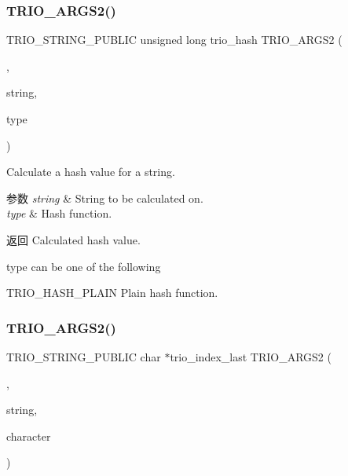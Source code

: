 \subsubsection{\texorpdfstring{T\+R\+I\+O\+\_\+\+A\+R\+G\+S2()}{TRIO\_ARGS2()}\hspace{0.1cm}{\footnotesize\ttfamily [5/9]}}
{\footnotesize\ttfamily T\+R\+I\+O\+\_\+\+S\+T\+R\+I\+N\+G\+\_\+\+P\+U\+B\+L\+IC unsigned long trio\+\_\+hash T\+R\+I\+O\+\_\+\+A\+R\+G\+S2 (\begin{DoxyParamCaption}\item[{(\hyperlink{structstring}{string}, type)}]{,  }\item[{T\+R\+I\+O\+\_\+\+C\+O\+N\+ST char $\ast$}]{string,  }\item[{int}]{type }\end{DoxyParamCaption})}

Calculate a hash value for a string.


\begin{DoxyParams}{参数}
{\em string} & String to be calculated on. \\
\hline
{\em type} & Hash function. \\
\hline
\end{DoxyParams}
\begin{DoxyReturn}{返回}
Calculated hash value.
\end{DoxyReturn}
{\ttfamily type} can be one of the following \begin{DoxyItemize}
\item {\ttfamily T\+R\+I\+O\+\_\+\+H\+A\+S\+H\+\_\+\+P\+L\+A\+IN} Plain hash function. \end{DoxyItemize}
\mbox{\label{group___static_strings_ga76aed1ea3034810e6f5c34af6a7157f8}} 
\subsubsection{\texorpdfstring{T\+R\+I\+O\+\_\+\+A\+R\+G\+S2()}{TRIO\_ARGS2()}\hspace{0.1cm}{\footnotesize\ttfamily [6/9]}}
{\footnotesize\ttfamily T\+R\+I\+O\+\_\+\+S\+T\+R\+I\+N\+G\+\_\+\+P\+U\+B\+L\+IC char $\ast$trio\+\_\+index\+\_\+last T\+R\+I\+O\+\_\+\+A\+R\+G\+S2 (\begin{DoxyParamCaption}\item[{(\hyperlink{structstring}{string}, character)}]{,  }\item[{T\+R\+I\+O\+\_\+\+C\+O\+N\+ST char $\ast$}]{string,  }\item[{int}]{character }\end{DoxyParamCaption})}

